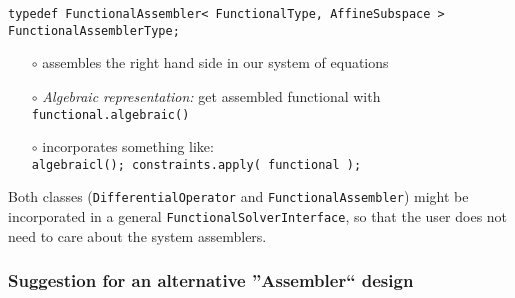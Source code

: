 \documentclass[a4paper,11pt]{article}
\numberwithin{equation}{section}
\newcommand{\CodeT}[1]{\textnormal{\texttt{#1}}}
\begin{document}
\noindent\CodeT{typedef FunctionalAssembler< FunctionalType, AffineSubspace >}\\
\CodeT{FunctionalAssemblerType;}
\begin{itemize}
	\item[$\circ$] assembles the right hand side in our system of equations
  \item[$\circ$] {\it Algebraic representation:} get assembled functional with \CodeT{functional.algebraic()}
  \item[$\circ$] incorporates something like:\\
\CodeT{algebraicl(); constraints.apply( functional );}
\end{itemize}

Both classes (\CodeT{DifferentialOperator} and \CodeT{FunctionalAssembler}) might be incorporated in a general \CodeT{FunctionalSolverInterface}, so that the user does not need to care about the system assemblers.




\subsubsection{Suggestion for an alternative ''Assembler`` design}
\end{document}
